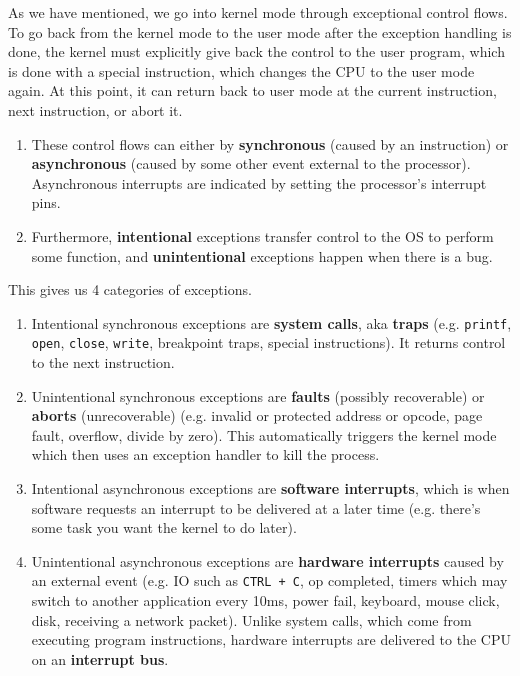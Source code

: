 \documentclass{article}
\begin{document}
    \begin{definition}
      As we have mentioned, we go into kernel mode through exceptional control flows. To go back from the kernel mode to the user mode after the exception handling is done, the kernel must explicitly give back the control to the user program, which is done with a special instruction, which changes the CPU to the user mode again. At this point, it can return back to user mode at the current instruction, next instruction, or abort it. 
      \begin{enumerate}
        \item These control flows can either by \textbf{synchronous} (caused by an instruction) or \textbf{asynchronous} (caused by some other event external to the processor). Asynchronous interrupts are indicated by setting the processor's interrupt pins. 
        \item Furthermore, \textbf{intentional} exceptions transfer control to the OS to perform some function, and \textbf{unintentional} exceptions happen when there is a bug. 
      \end{enumerate}
      This gives us 4 categories of exceptions. 
      \begin{enumerate}
        \item Intentional synchronous exceptions are \textbf{system calls}, aka \textbf{traps} (e.g. \texttt{printf}, \texttt{open}, \texttt{close}, \texttt{write}, breakpoint traps, special instructions). It returns control to the next instruction. 
        \item Unintentional synchronous exceptions are \textbf{faults} (possibly recoverable) or \textbf{aborts} (unrecoverable) (e.g. invalid or protected address or opcode, page fault, overflow, divide by zero). This automatically triggers the kernel mode which then uses an exception handler to kill the process.  
        \item Intentional asynchronous exceptions are \textbf{software interrupts}, which is when software requests an interrupt to be delivered at a later time (e.g. there's some task you want the kernel to do later). 
        \item Unintentional asynchronous exceptions are \textbf{hardware interrupts} caused by an external event (e.g. IO such as \texttt{CTRL + C}, op completed, timers which may switch to another application every 10ms, power fail, keyboard, mouse click, disk, receiving a network packet). Unlike system calls, which come from executing program instructions, hardware interrupts are delivered to the CPU on an \textbf{interrupt bus}. 

\end{enumerate}
\end{definition}
\end{document}

